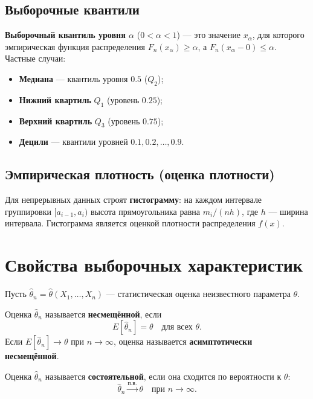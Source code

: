 \documentclass[10pt]{article}
\begin{document}
\subsection{Выборочные квантили}
\begin{definition}
\textbf{Выборочный квантиль уровня $\alpha$} ($0<\alpha<1$) — это значение $x_\alpha$, для которого эмпирическая функция распределения $F_n(x_\alpha) \ge \alpha$, а $F_n(x_\alpha - 0) \le \alpha$. Частные случаи:
\begin{itemize}
    \item \textbf{Медиана} — квантиль уровня $0.5$ ($Q_2$);
    \item \textbf{Нижний квартиль} $Q_1$ (уровень $0.25$);
    \item \textbf{Верхний квартиль} $Q_3$ (уровень $0.75$);
    \item \textbf{Децили} — квантили уровней $0.1, 0.2, \dots, 0.9$.
\end{itemize}
\end{definition}

\subsection{Эмпирическая плотность (оценка плотности)}
Для непрерывных данных строят \textbf{гистограмму}: на каждом интервале группировки $[a_{i-1}, a_i)$ высота прямоугольника равна $m_i/(n h)$, где $h$ — ширина интервала. Гистограмма является оценкой плотности распределения $f(x)$.

\section{Свойства выборочных характеристик}

Пусть $\hat{\theta}_n = \hat{\theta}(X_1,\dots,X_n)$ — статистическая оценка неизвестного параметра $\theta$.

\begin{definition}
Оценка $\hat{\theta}_n$ называется \textbf{несмещённой}, если
\[
E[\hat{\theta}_n] = \theta \quad \text{для всех } \theta.
\]
Если $E[\hat{\theta}_n] \to \theta$ при $n\to\infty$, оценка называется \textbf{асимптотически несмещённой}.
\end{definition}

\begin{definition}
Оценка $\hat{\theta}_n$ называется \textbf{состоятельной}, если она сходится по вероятности к $\theta$:
\[
\hat{\theta}_n \xrightarrow{\text{п.в.}} \theta \quad \text{при } n\to\infty.
\]
\end{definition}
\end{document}
